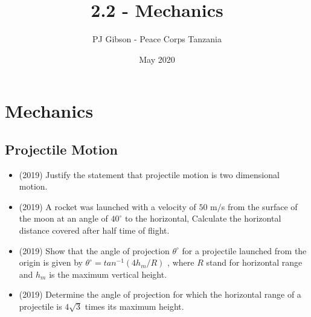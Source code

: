 \documentclass{article}
\title{2.2 - Mechanics}
\author{PJ Gibson - Peace Corps Tanzania}
\date{May 2020}
\begin{document}
\maketitle


\section{Mechanics}

\subsection{Projectile Motion}
\begin{itemize}
\item (2019)  Justify the statement that projectile motion is two dimensional motion.
\item (2019)  A rocket was launched with a velocity of $ 50$ m$/$s from the surface of the moon at an angle of $ 40^{\circ}$ to the horizontal, Calculate the horizontal distance covered  after half time of flight.
\item (2019)  Show that the angle of projection $ \theta ^{\circ}$ for a projectile launched from the origin is given by $ \theta ^{\circ}= tan^{-1}(4h_{m}/R)$ , where $ R$ stand for horizontal range and $ h_{m}$ is the maximum vertical height.
\item (2019)  Determine the angle of projection for which the horizontal range of a projectile is $ 4\sqrt{3}$ times its maximum height. 
\end{itemize}
\end{document}
